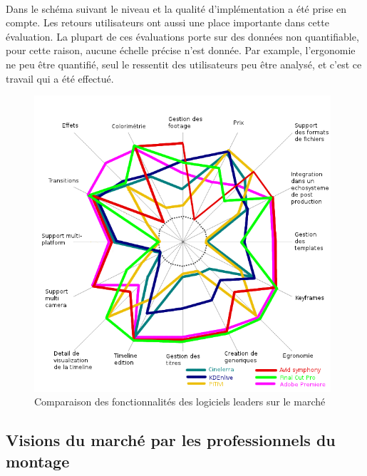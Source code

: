   \paragraph{}
  Dans le schéma suivant le niveau et la qualité d'implémentation a été prise en compte. Les
  retours utilisateurs ont aussi une place importante dans cette évaluation. La plupart de ces
  évaluations porte sur des données non quantifiable, pour cette raison, aucune échelle précise n'est donnée.
  Par example, l'ergonomie ne peu être quantifié, seul le ressentit des utilisateurs peu être analysé,
  et c'est ce travail qui a été effectué.

  \begin{figure}
      \begin{center}
        \includegraphics[width=0.98\textwidth]{images/spiderDiagramFeaturesComparision}
      \end{center}
      \caption{Comparaison des fonctionnalités des logiciels leaders sur le marché}
      \label{Yes}
  \end{figure}
  \newpage

\subsection{Visions du marché par les professionnels du montage}

